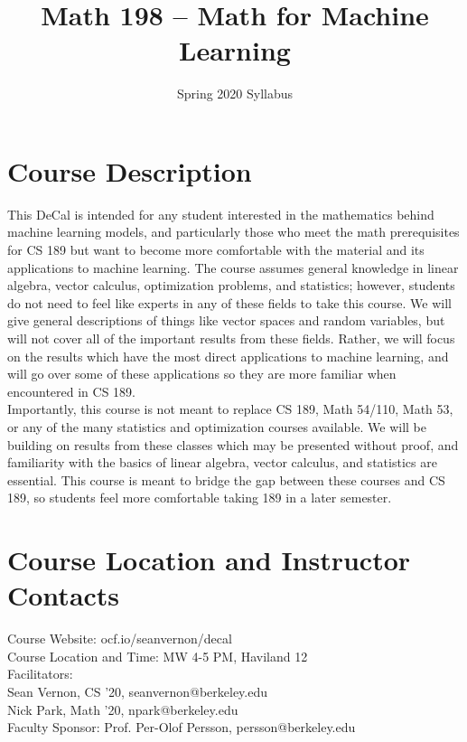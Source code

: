 \documentclass{article}
\title{Math 198 -- Math for Machine Learning}
\author{Spring 2020 Syllabus}
\date{}
\begin{document}
\maketitle

\section{Course Description}
This DeCal is intended for any student interested in the mathematics behind machine learning models, and particularly those who meet the math prerequisites for CS 189 but want to become more comfortable with the material and its applications to machine learning. The course assumes general knowledge in linear algebra, vector calculus, optimization problems, and statistics; however, students do not need to feel like experts in any of these fields to take this course. We will give general descriptions of things like vector spaces and random variables, but will not cover all of the important results from these fields. Rather, we will focus on the results which have the most direct applications to machine learning, and will go over some of these applications so they are more familiar when encountered in CS 189. \\
Importantly, this course is not meant to replace CS 189, Math 54/110, Math 53, or any of the many statistics and optimization courses available. We will be building on results from these classes which may be presented without proof, and familiarity with the basics of linear algebra, vector calculus, and statistics are essential. This course is meant to bridge the gap between these courses and CS 189, so students feel more comfortable taking 189 in a later semester.

\section{Course Location and Instructor Contacts}
Course Website: ocf.io/seanvernon/decal \\

\noindent
Course Location and Time: MW 4-5 PM, Haviland 12\\

\noindent
Facilitators: \\
Sean Vernon, CS '20, seanvernon@berkeley.edu\\
Nick Park, Math '20, npark@berkeley.edu \\

\noindent
Faculty Sponsor: Prof. Per-Olof Persson, persson@berkeley.edu
\end{document}
